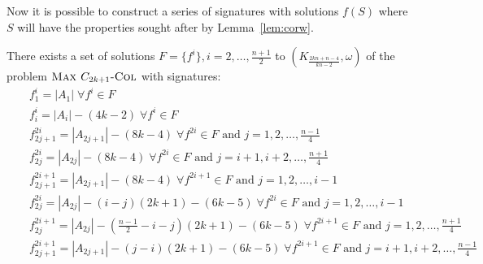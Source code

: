 \documentclass[11pt,a4paper]{article}
\begin{document}
Now it is possible to construct a series of signatures with solutions $f(S)$ where $S$ will have the properties sought after by Lemma~\ref{lem:corw}.

\begin{lemma}
\label{lem:splitmiddle}
There exists a set of solutions $F = \{ f^i \}, i = 2,\ldots,\frac{n+1}{2}$ to $(K_{\frac{2kn+n-4}{kn-2}},\omega)$ of the problem $\mbox{\sc Max $C_{2k+1}$-Col}$ with signatures:
\begin{eqnarray*}
  & & f^i_1=|A_1| 
  \; \forall f^i \in F \\
  & & f^i_i=|A_i|-(4k-2) 
  \; \forall f^i \in F \\
  & & f^{2i}_{2j+1}=|A_{2j+1}|-(8k-4)
  \; \forall f^{2i} \in F \mbox{ and } j = 1,2,\ldots,\frac{n-1}{4} \\
  & & f^{2i}_{2j}=|A_{2j}|-(8k-4)
  \; \forall f^{2i} \in F \mbox{ and }  j = i+1,i+2,\ldots,\frac{n+1}{4} \\
  & & f^{2i+1}_{2j+1}=|A_{2j+1}|-(8k-4)
  \; \forall f^{2i+1} \in F \mbox{ and } j = 1,2,\ldots,i-1 \\
  & & f^{2i}_{2j}=|A_{2j}|-(i-j)(2k+1)-(6k-5)
  \; \forall f^{2i} \in F \mbox{ and } j = 1,2,\ldots,i-1 \\
  & & f^{2i+1}_{2j}=|A_{2j}|-(\frac{n-1}{2}-i-j)(2k+1)-(6k-5) 
  \; \forall f^{2i+1} \in F \mbox{ and } j = 1,2,\ldots,\frac{n+1}{4} \\
  & & f^{2i+1}_{2j+1}=|A_{2j+1}|-(j-i)(2k+1)-(6k-5)
  \; \forall f^{2i+1} \in F \mbox{ and } j = i+1,i+2,\ldots,\frac{n-1}{4} \\
\end{eqnarray*}
\end{lemma}
\end{document}
